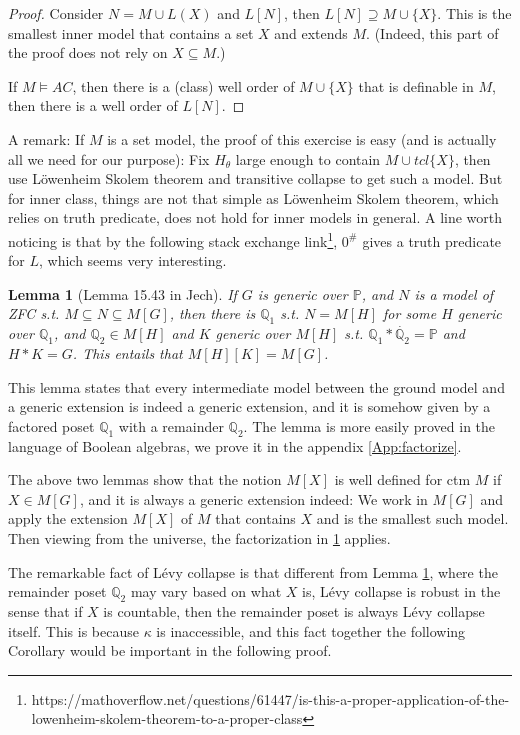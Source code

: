 \documentclass{article}
\newtheorem{lemma}{Lemma}
\newcommand{\bbP}{\mathbb{P}}
\newcommand{\bbQ}{\mathbb{Q}}
\begin{document}
\begin{proof}
    Consider $N = M\cup L(X)$ and $L[N]$, then $L[N]\supseteq M\cup \{X\}$. This is the smallest inner model that contains a set $X$ and extends $M$. (Indeed, this part of the proof does not rely on $X\subseteq M$.)

    If $M\models AC$, then there is a (class) well order of $M\cup \{X\}$ that is definable in $M$, then there is a well order of $L[N]$.
\end{proof}

A remark: If $M$ is a set model, the proof of this exercise is easy (and is actually all we need for our purpose): Fix $H_\theta$ large enough to contain $M\cup tcl\{X\}$, then use L\"owenheim Skolem theorem and transitive collapse to get such a model. But for inner class, things are not that simple as L\"owenheim Skolem theorem, which relies on truth predicate, does not hold for inner models in general. A line worth noticing is that by the following stack exchange link\footnote{https://mathoverflow.net/questions/61447/is-this-a-proper-application-of-the-lowenheim-skolem-theorem-to-a-proper-class}, $0^\#$ gives a truth predicate for $L$, which seems very interesting.

\begin{lemma}[Lemma 15.43 in Jech]\label{lem:general-factorize}
    If $G$ is generic over $\bbP$, and $N$ is a model of ZFC s.t. $M\subseteq N\subseteq M[G]$, then there is $\bbQ_1$ s.t. $N = M[H]$ for some $H$ generic over $\bbQ_1$, and $\bbQ_2\in M[H]$ and $K$ generic over $M[H]$ s.t. $\bbQ_1 *\dot{\bbQ_2} = \bbP$ and $H*K = G$. This entails that $M[H][K] = M[G]$.
\end{lemma}

This lemma states that every intermediate model between the ground model and a generic extension is indeed a generic extension, and it is somehow given by a factored poset $\bbQ_1$ with a remainder $\bbQ_2$. The lemma is more easily proved in the language of Boolean algebras, we prove it in the appendix \ref{App:factorize}.

The above two lemmas show that the notion $M[X]$ is well defined for ctm $M$ if $X\in M[G]$, and it is always a generic extension indeed: We work in $M[G]$ and apply the extension $M[X]$ of $M$ that contains $X$ and is the smallest such model. Then viewing from the universe, the factorization in \ref{lem:general-factorize} applies.

The remarkable fact of L\'evy collapse is that different from Lemma \ref{lem:general-factorize}, where the remainder poset $\bbQ_2$ may vary based on what $X$ is, L\'evy collapse is robust in the sense that if $X$ is countable, then the remainder poset is always L\'evy collapse itself. This is because $\kappa$ is inaccessible, and this fact together the following Corollary would be important in the following proof.
\end{document}
